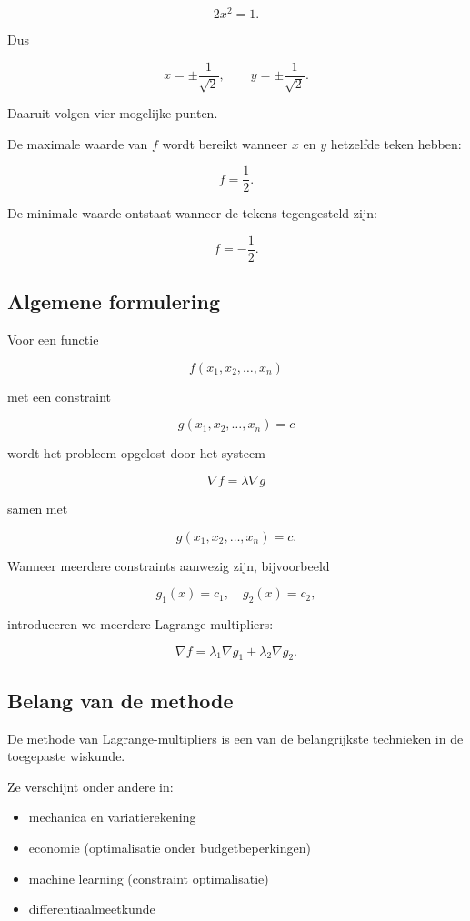 \documentclass[11pt,a4paper]{article}
\begin{document}
    \[
        2x^2 = 1.
    \]

    Dus

    \[
        x = \pm \frac{1}{\sqrt{2}},
        \qquad
        y = \pm \frac{1}{\sqrt{2}}.
    \]

    Daaruit volgen vier mogelijke punten.

    De maximale waarde van $f$ wordt bereikt wanneer
    $x$ en $y$ hetzelfde teken hebben:

    \[
        f = \frac{1}{2}.
    \]

    De minimale waarde ontstaat wanneer de tekens tegengesteld zijn:

    \[
        f = -\frac{1}{2}.
    \]

    \subsection{Algemene formulering}

    Voor een functie

    \[
        f(x_1,x_2,\dots,x_n)
    \]

    met een constraint

    \[
        g(x_1,x_2,\dots,x_n)=c
    \]

    wordt het probleem opgelost door het systeem

    \[
        \nabla f = \lambda \nabla g
    \]

    samen met

    \[
        g(x_1,x_2,\dots,x_n)=c.
    \]

    Wanneer meerdere constraints aanwezig zijn,
    bijvoorbeeld

    \[
        g_1(x)=c_1, \quad g_2(x)=c_2,
    \]

    introduceren we meerdere Lagrange-multipliers:

    \[
        \nabla f = \lambda_1 \nabla g_1 + \lambda_2 \nabla g_2.
    \]

    \subsection{Belang van de methode}

    De methode van Lagrange-multipliers is een van de
    belangrijkste technieken in de toegepaste wiskunde.

    Ze verschijnt onder andere in:

    \begin{itemize}

        \item mechanica en variatierekening

        \item economie (optimalisatie onder budgetbeperkingen)

        \item machine learning (constraint optimalisatie)

        \item differentiaalmeetkunde

    \end{itemize}
\end{document}
